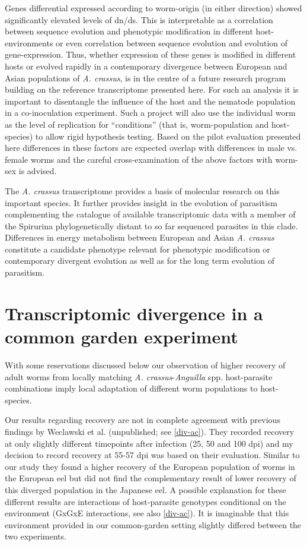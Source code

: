 Genes differential expressed according to worm-origin (in either
direction) showed significantly elevated levels of dn/ds. This is
interpretable as a correlation between sequence evolution and
phenotypic modification in different host-environments or even
correlation between sequence evolution and evolution of
gene-expression. Thus, whether expression of these genes is modified
in different hosts or evolved rapidly in a contemporary divergence
between European and Asian populations of \textit{A. crassus}, is in
the centre of a future research program building on the reference
transcriptome presented here. For such an analysis it is important to
disentangle the influence of the host and the nematode population in a
co-inoculation experiment. Such a project will also use the individual
worm as the level of replication for ``conditions'' (that is,
worm-population and host-species) to allow rigid hypothesis
testing. Based on the pilot evaluation presented here differences in
these factors are expected overlap with differences in male vs. female
worms and the careful cross-examination of the above factors with
worm-sex is advised.

The \textit{A. crassus} transcriptome provides a basis of molecular
research on this important species. It further provides insight in the
evolution of parasitism complementing the catalogue of available
transcriptomic data with a member of the Spirurina phylogenetically
distant to so far sequenced parasites in this clade. Differences in
energy metabolism between European and Asian \textit{A. crassus}
constitute a candidate phenotype relevant for phenotypic modification
or contemporary divergent evolution as well as for the long term
evolution of parasitism.


\section{Transcriptomic divergence in a common garden experiment}
\label{sec:exp-inf}

With some reservations discussed below our observation of higher
recovery of adult worms from locally matching
\textit{A. crassus}-\textit{Anguilla} spp. host-parasite combinations
imply local adaptation of different worm populations to host-species.

Our results regarding recovery are not in complete agreement with
previous findings by Weclawski et al. (unpublished; see
\ref{div-ac}). They recorded recovery at only slightly different
timepoints after infection (25, 50 and 100 dpi) and my decision to
record recovery at 55-57 dpi was based on their evaluation.  Similar
to our study they found a higher recovery of the European population
of worms in the European eel but did not find the complementary result
of lower recovery of this diverged population in the Japanese eel. A
possible explanation for these different results are interactions of
host-parasite genotypes conditional on the environment (GxGxE
interactions, see also \ref{div-ac}). It is imaginable that this
environment provided in our common-garden setting slightly differed
between the two experiments.

